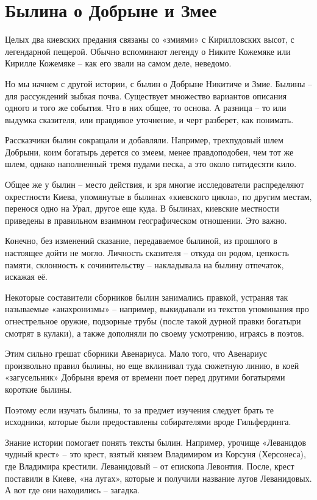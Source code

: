 \chapter{Былина о Добрыне и Змее}

Целых два киевских предания связаны со «змиями» с Кирилловских высот, с легендарной пещерой. Обычно вспоминают легенду о Никите Кожемяке или Кирилле Кожемяке – как его звали на самом деле, неведомо.

Но мы начнем с другой истории, с былин о Добрыне Никитиче и Змие. Былины – для рассуждений зыбкая почва. Существует множество вариантов описания одного и того же события. Что в них общее, то основа. А разница – то или выдумка сказителя, или правдивое уточнение, и черт разберет, как понимать. 

Рассказчики былин сокращали и добавляли. Например, трехпудовый шлем Добрыни, коим богатырь дерется со змеем, менее правдоподобен, чем тот же шлем, однако наполненный тремя пудами песка, а это около пятидесяти кило.

Общее же у былин – место действия, и зря многие исследователи распределяют окрестности Киева, упомянутые в былинах «киевского цикла», по другим местам, перенося одно на Урал, другое еще куда. В былинах, киевские местности приведены в правильном взаимном географическом отношении. Это важно.

Конечно, без изменений сказание, передаваемое былиной, из прошлого в настоящее дойти не могло. Личность сказителя – откуда он родом, цепкость памяти, склонность к сочинительству – накладывала на былину отпечаток, искажая её.

Некоторые составители сборников былин занимались правкой, устраняя так называемые «анахронизмы» – например, выкидывали из текстов упоминания про огнестрельное оружие, подзорные трубы (после такой дурной правки богатыри смотрят в кулаки), а также дополняли по своему усмотрению, играясь в поэтов. 

Этим сильно грешат сборники Авенариуса. Мало того, что Авенариус произвольно правил былины, но еще вклинивал туда сюжетную линию, в коей «загусельник» Добрыня время от времени поет перед другими богатырями короткие былины. 

Поэтому если изучать былины, то за предмет изучения следует брать те исходники, которые были предоставлены собирателями вроде Гильфердинга.

Знание истории помогает понять тексты былин. Например, урочище «Леванидов чудный крест» – это крест, взятый князем Владимиром из Корсуня (Херсонеса), где Владимира крестили. Леванидовый – от епископа Левонтия. После, крест поставили в Киеве, «на лугах», которые и получили название лугов Леванидовых. А вот где они находились – загадка.

